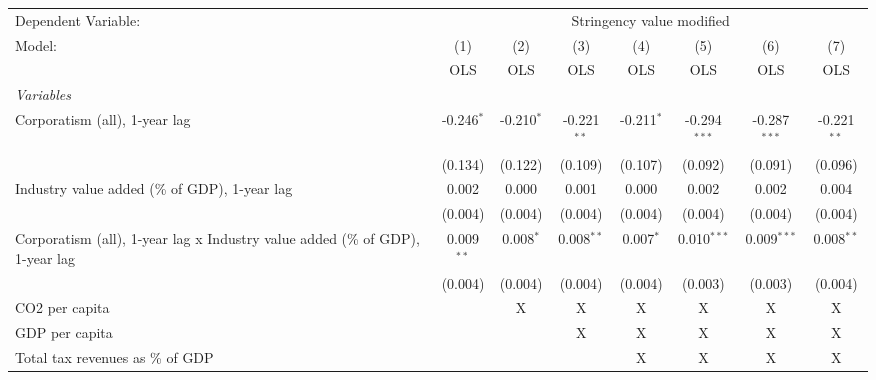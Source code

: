 
\begingroup
\centering
\begin{tabular}{lccccccc}
   \toprule
   Dependent Variable: & \multicolumn{7}{c}{Stringency value modified}\\
   Model:                                                                        & (1)          & (2)          & (3)           & (4)          & (5)            & (6)            & (7)\\  
                                                                                 &  OLS         & OLS          & OLS           & OLS          & OLS            & OLS            & OLS\\  
   \midrule
   \emph{Variables}\\
   Corporatism (all), 1-year lag                                                 & -0.246$^{*}$ & -0.210$^{*}$ & -0.221$^{**}$ & -0.211$^{*}$ & -0.294$^{***}$ & -0.287$^{***}$ & -0.221$^{**}$\\   
                                                                                 & (0.134)      & (0.122)      & (0.109)       & (0.107)      & (0.092)        & (0.091)        & (0.096)\\   
   Industry value added (\% of GDP), 1-year lag                                  & 0.002        & 0.000        & 0.001         & 0.000        & 0.002          & 0.002          & 0.004\\   
                                                                                 & (0.004)      & (0.004)      & (0.004)       & (0.004)      & (0.004)        & (0.004)        & (0.004)\\   
   Corporatism (all), 1-year lag x Industry value added (\% of GDP), 1-year lag  & 0.009$^{**}$ & 0.008$^{*}$  & 0.008$^{**}$  & 0.007$^{*}$  & 0.010$^{***}$  & 0.009$^{***}$  & 0.008$^{**}$\\   
                                                                                 & (0.004)      & (0.004)      & (0.004)       & (0.004)      & (0.003)        & (0.003)        & (0.004)\\   
   CO2 per capita                                                                &              & X            & X             & X            & X              & X              & X\\  
   GDP per capita                                                                &              &              & X             & X            & X              & X              & X\\  
   Total tax revenues as \% of GDP                                               &              &              &               & X            & X              & X              & X\\  

\end{tabular}
